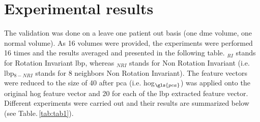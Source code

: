\section{ Experimental results}\label{sec:results}

The validation was done on a leave one patient out basis (one \gls{dme} volume, one normal volume).
As 16 volumes were provided, the experiments were performed 16 times and the results averaged and presented in the following table.
$_{RI}$ stands for Rotation Invariant \gls{lbp}, whereas $_{NRI}$ stands for Non Rotation Invariant (i.e. \gls{lbp}$_{8-NRI}$ stands for 8 neighbors Non Rotation Invariant).
The feature vectors were reduced to the size of 40 after \gls{pca} (i.e. \gls{hog}$_{\gls{pca}}$) was applied onto the original \gls{hog} feature vector and 20 for each of the \gls{lbp} extracted feature vector.
Different experiments were carried out and their results are summarized below (see Table.\,\ref{tab:tab1}).


\begin{table*}
\caption{Outline and summary of the performed experiments and obtained results.}
\centering
{}
\label{tab:tab1}
\end{table*}
